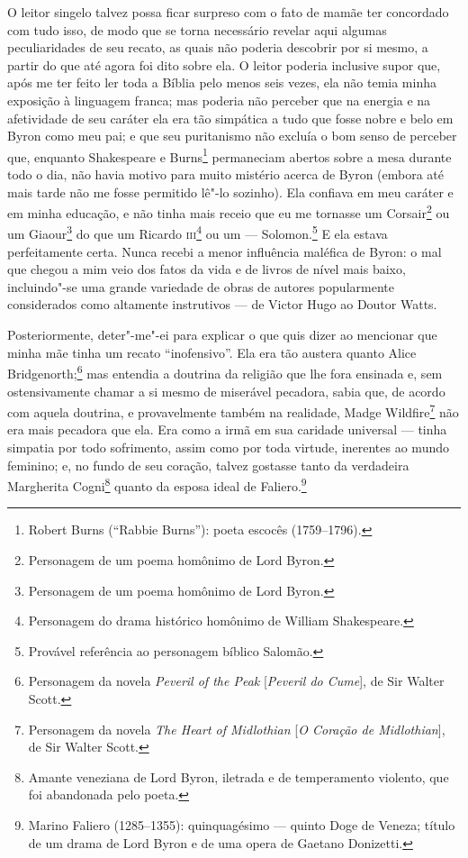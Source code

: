 O leitor singelo talvez possa ficar surpreso com o fato de mamãe
ter concordado com tudo isso, de modo que se torna necessário revelar
aqui algumas peculiaridades de seu recato, as quais não poderia
descobrir por si mesmo, a partir do que até agora foi dito sobre ela. O
leitor poderia inclusive supor que, após me ter feito ler toda a Bíblia
pelo menos seis vezes, ela não temia minha exposição à linguagem franca;
mas poderia não perceber que na energia e na afetividade de seu caráter
ela era tão simpática a tudo que fosse nobre e belo em Byron como meu
pai; e que seu puritanismo não excluía o bom senso de perceber que,
enquanto Shakespeare e Burns\footnote{Robert Burns (``Rabbie Burns''):
  poeta escocês (1759--1796).} permaneciam abertos sobre a
mesa durante todo o dia, não havia motivo para muito mistério acerca de
Byron (embora até mais tarde não me fosse permitido lê"-lo sozinho). Ela
confiava em meu caráter e em minha educação, e não tinha mais receio que
eu me tornasse um Corsair\footnote{Personagem de um poema homônimo de
  Lord Byron.} ou um Giaour\footnote{Personagem de um \label{giaour}
  poema homônimo de Lord Byron.} do que um Ricardo
\textsc{iii}\footnote{Personagem do drama histórico homônimo de William
  Shakespeare.} ou um --- Solomon.\footnote{Provável
  referência ao personagem bíblico Salomão.} E ela
estava perfeitamente certa. Nunca recebi a menor influência maléfica de
Byron: o mal que chegou a mim veio dos fatos da vida e de livros de
nível mais baixo, incluindo"-se uma grande variedade de obras de autores
popularmente considerados como altamente instrutivos --- de Victor Hugo
ao Doutor Watts.

Posteriormente, deter"-me"-ei para explicar o que quis dizer ao
mencionar que minha mãe tinha um recato ``inofensivo''. Ela era tão
austera quanto Alice Bridgenorth;\footnote{Personagem da novela
  \textit{Peveril of the Peak} {[}\textit{Peveril do Cume}{]}, de Sir Walter
  Scott.} mas entendia a doutrina da religião que lhe
fora ensinada e, sem ostensivamente chamar a si mesmo de miserável
pecadora, sabia que, de acordo com aquela doutrina, e provavelmente
também na realidade, Madge Wildfire\footnote{Personagem da novela
  \textit{The Heart of Midlothian} {[}\textit{O Coração de Midlothian}{]},
  de Sir Walter Scott.} não era mais pecadora que ela.
Era como a irmã em sua caridade universal --- tinha simpatia por todo
sofrimento, assim como por toda virtude, inerentes ao mundo feminino; e,
no fundo de seu coração, talvez gostasse tanto da verdadeira Margherita
Cogni\footnote{Amante veneziana de Lord Byron, iletrada e de
  temperamento violento, que foi abandonada pelo poeta.}
quanto da esposa ideal de Faliero.\footnote{Marino Faliero (1285--1355):
  quinquagésimo --- quinto Doge de Veneza; título de um drama de Lord
  Byron e de uma opera de Gaetano Donizetti.}

